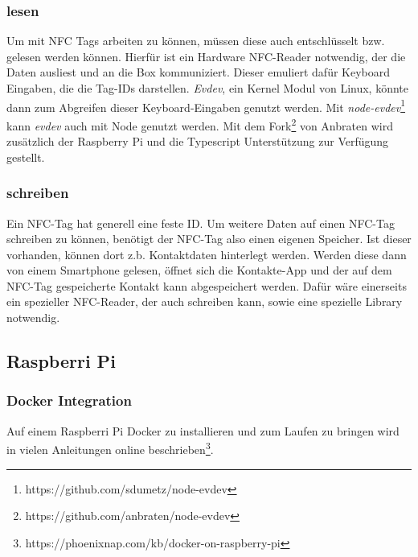 \documentclass[10pt, a4paper]{article}
\begin{document}
\subsubsection{lesen}
Um mit NFC Tags arbeiten zu können, müssen diese auch entschlüsselt bzw. gelesen werden können.
Hierfür ist ein Hardware NFC-Reader notwendig, der die Daten ausliest und an die Box kommuniziert.
Dieser emuliert dafür Keyboard Eingaben, die die Tag-IDs darstellen.
\textit{Evdev}, ein Kernel Modul von Linux, könnte dann zum Abgreifen dieser Keyboard-Eingaben genutzt werden. Mit \textit{node-evdev}\footnote{https://github.com/sdumetz/node-evdev} kann \textit{evdev} auch mit Node genutzt werden. Mit dem Fork\footnote{https://github.com/anbraten/node-evdev} von Anbraten wird zusätzlich der Raspberry Pi und die Typescript Unterstützung zur Verfügung gestellt.

\subsubsection{schreiben}
Ein NFC-Tag hat generell eine feste ID.
Um weitere Daten auf einen NFC-Tag schreiben zu können, benötigt der NFC-Tag also einen eigenen Speicher.
Ist dieser vorhanden, können dort z.b. Kontaktdaten hinterlegt werden. Werden diese dann von einem Smartphone gelesen, öffnet sich die Kontakte-App und der auf dem NFC-Tag gespeicherte Kontakt kann abgespeichert werden.
Dafür wäre einerseits ein spezieller NFC-Reader, der auch schreiben kann, sowie eine spezielle Library notwendig.

\subsection{Raspberri Pi}
\subsubsection{Docker Integration}
Auf einem Raspberri Pi Docker zu installieren und zum Laufen zu bringen wird in vielen Anleitungen online beschrieben\footnote{https://phoenixnap.com/kb/docker-on-raspberry-pi}.
\end{document}
